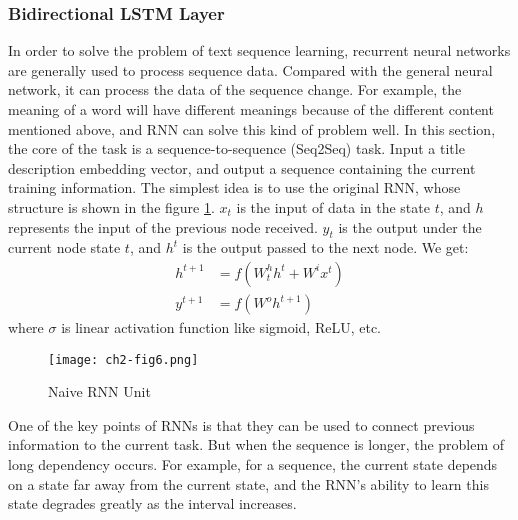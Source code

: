 \subsubsection{Bidirectional LSTM Layer}


In order to solve the problem of text sequence learning, recurrent neural networks are generally used to process sequence data. Compared with the general neural network, it can process the data of the sequence change. For example, the meaning of a word will have different meanings because of the different content mentioned above, and RNN can solve this kind of problem well. In this section, the core of the task is a sequence-to-sequence (Seq2Seq) task. Input a title description embedding vector, and output a sequence containing the current training information. The simplest idea is to use the original RNN, whose structure is shown in the figure \ref{ch2-fig6}. $x_t$ is the input of data in the state $t$, and $h$ represents the input of the previous node received. $y_t$ is the output under the current node state $t$, and $h^{t}$ is the output passed to the next node. We get:
\begin{align}
	h^{t+1} & =f(W^h_{t} h^t+W^i x^t) \\
	y^{t+1} & =f(W^o h^{t+1})
\end{align}
where $\sigma$ is linear activation function like sigmoid, ReLU, etc.

\begin{figure}[h]
	\centering
	\texttt{[image: ch2-fig6.png]}
	\caption{Naive RNN Unit}
	\label{ch2-fig6}
\end{figure}

One of the key points of RNNs is that they can be used to connect previous information to the current task. But when the sequence is longer, the problem of long dependency occurs. For example, for a sequence, the current state depends on a state far away from the current state, and the RNN's ability to learn this state degrades greatly as the interval increases.

